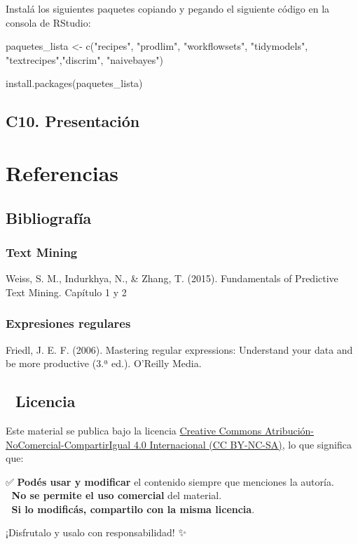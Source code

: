 \documentclass[
  letterpaper,
  DIV=11,
  numbers=noendperiod]{scrreprt}
\newenvironment{Shaded}{\begin{snugshade}}{\end{snugshade}}
\newcommand{\FunctionTok}[1]{\textcolor[rgb]{0.28,0.35,0.67}{#1}}
\newcommand{\NormalTok}[1]{\textcolor[rgb]{0.00,0.23,0.31}{#1}}
\newcommand{\OtherTok}[1]{\textcolor[rgb]{0.00,0.23,0.31}{#1}}
\newcommand{\StringTok}[1]{\textcolor[rgb]{0.13,0.47,0.30}{#1}}
\begin{document}
Instalá los siguientes paquetes copiando y pegando el siguiente código
en la consola de RStudio:

\begin{Shaded}
\begin{Highlighting}[]

\NormalTok{paquetes\_lista }\OtherTok{\textless{}{-}}  \FunctionTok{c}\NormalTok{(}\StringTok{"recipes"}\NormalTok{, }\StringTok{"prodlim"}\NormalTok{, }\StringTok{"workflowsets"}\NormalTok{, }\StringTok{"tidymodels"}\NormalTok{, }\StringTok{"textrecipes"}\NormalTok{,}\StringTok{"discrim"}\NormalTok{, }\StringTok{"naivebayes"}\NormalTok{)}

\FunctionTok{install.packages}\NormalTok{(paquetes\_lista)}
\end{Highlighting}
\end{Shaded}

\chapter{C10. Presentación}\label{c10.-presentaciuxf3n}

\part{\textbf{Referencias}}

\chapter{Bibliografía}\label{bibliografuxeda}

\section{Text Mining}\label{text-mining}

Weiss, S. M., Indurkhya, N., \& Zhang, T. (2015). Fundamentals of
Predictive Text Mining. Capítulo 1 y 2

\section{Expresiones regulares}\label{expresiones-regulares}

Friedl, J. E. F. (2006). Mastering regular expressions: Understand your
data and be more productive (3.ª ed.). O'Reilly Media.

\chapter{📜 Licencia}\label{licencia}

Este material se publica bajo la licencia
\href{https://creativecommons.org/licenses/by-nc-sa/4.0/}{Creative
Commons Atribución-NoComercial-CompartirIgual 4.0 Internacional (CC
BY-NC-SA)}, lo que significa que:

✅ \textbf{Podés usar y modificar} el contenido siempre que menciones la
autoría.\\
🚫 \textbf{No se permite el uso comercial} del material.\\
🔄 \textbf{Si lo modificás, compartilo con la misma licencia}.

¡Disfrutalo y usalo con responsabilidad! ✨
\end{document}
